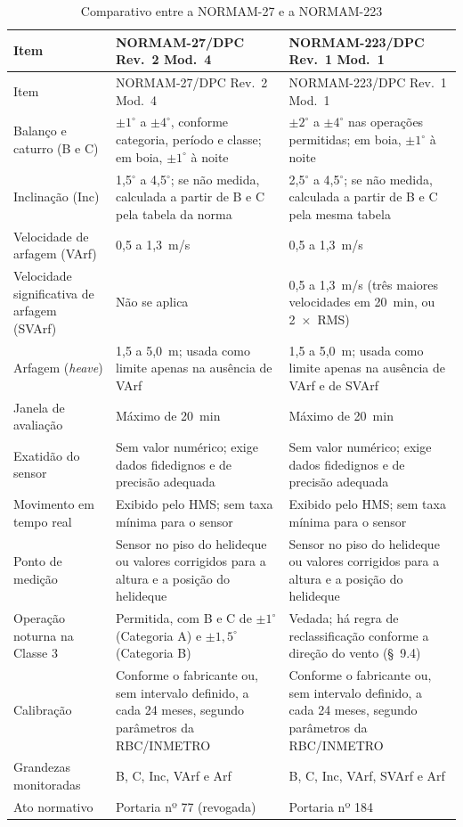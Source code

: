 \documentclass[a4paper, 12pt]{article}
\begin{document}
\begin{small}
\renewcommand{\arraystretch}{1.3}
\begin{longtable}{|m{3.2cm}|m{5.5cm}|m{5.5cm}|}
\caption{Comparativo entre a NORMAM-27 e a NORMAM-223}
\label{tab:normam}\\
\hline
\centering Item & \centering NORMAM-27/DPC Rev.~2 Mod.~4 &
\centering NORMAM-223/DPC Rev.~1 Mod.~1 \tabularnewline \hline
\endfirsthead
\hline
\centering Item & \centering NORMAM-27/DPC Rev.~2 Mod.~4 &
\centering NORMAM-223/DPC Rev.~1 Mod.~1 \tabularnewline \hline
\endhead
Balanço e caturro (B e C) & $\pm1^\circ$ a $\pm4^\circ$, conforme categoria, período e
classe; em boia, $\pm1^\circ$ à noite & $\pm2^\circ$ a $\pm4^\circ$ nas operações
permitidas; em boia, $\pm1^\circ$ à noite \\ \hline
Inclinação (Inc) & 1,5$^\circ$ a 4,5$^\circ$; se não medida, calculada a partir de B e C
pela tabela da norma & 2,5$^\circ$ a 4,5$^\circ$; se não medida, calculada a partir de B e
C pela mesma tabela \\ \hline
Velocidade de arfagem (VArf) & 0,5 a 1,3~m/s & 0,5 a 1,3~m/s \\ \hline
Velocidade significativa de arfagem (SVArf) & Não se aplica & 0,5 a 1,3~m/s (três maiores
velocidades em 20~min, ou 2~$\times$~RMS) \\ \hline
Arfagem (\textit{heave}) & 1,5 a 5,0~m; usada como limite apenas na ausência de VArf &
1,5 a 5,0~m; usada como limite apenas na ausência de VArf e de SVArf \\ \hline
Janela de avaliação & Máximo de 20~min & Máximo de 20~min \\ \hline
Exatidão do sensor & Sem valor numérico; exige dados fidedignos e de precisão adequada &
Sem valor numérico; exige dados fidedignos e de precisão adequada \\ \hline
Movimento em tempo real & Exibido pelo HMS; sem taxa mínima para o sensor & Exibido pelo
HMS; sem taxa mínima para o sensor \\ \hline
Ponto de medição & Sensor no piso do helideque ou valores corrigidos para a altura e a
posição do helideque & Sensor no piso do helideque ou valores corrigidos para a altura e a
posição do helideque \\ \hline
Operação noturna na Classe 3 & Permitida, com B e C de $\pm1^\circ$ (Categoria A) e
$\pm1{,}5^\circ$ (Categoria B) & Vedada; há regra de reclassificação conforme a direção do
vento (§~9.4) \\ \hline
Calibração & Conforme o fabricante ou, sem intervalo definido, a cada 24 meses, segundo
parâmetros da RBC/INMETRO & Conforme o fabricante ou, sem intervalo definido, a cada 24
meses, segundo parâmetros da RBC/INMETRO \\ \hline
Grandezas monitoradas & B, C, Inc, VArf e Arf & B, C, Inc, VArf, SVArf e Arf \\ \hline
Ato normativo & Portaria nº 77 (revogada) & Portaria nº 184 \\ \hline
\end{longtable}
\end{small}
\end{document}
